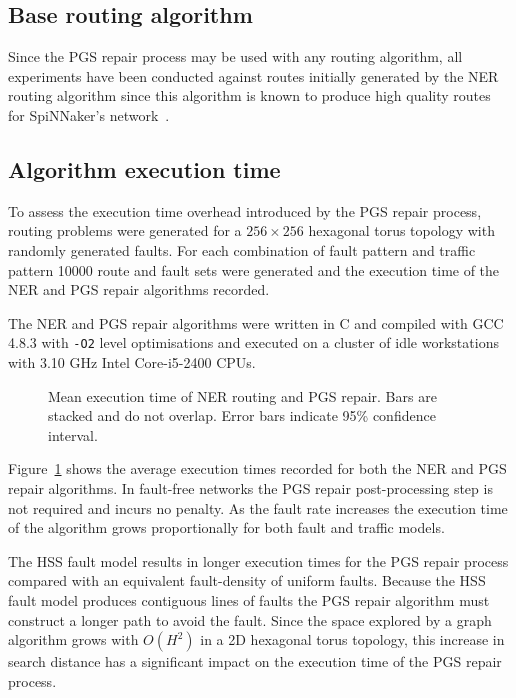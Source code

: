 		\subsection{Base routing algorithm}
			
			Since the PGS repair process may be used with any routing algorithm, all
			experiments have been conducted against routes initially generated by the
			NER routing algorithm since this algorithm is known to produce high
			quality routes for SpiNNaker's network~\cite{navaridas14}.
			
		\subsection{Algorithm execution time}
			
			To assess the execution time overhead introduced by the PGS repair
			process, routing problems were generated for a $256\times256$ hexagonal
			torus topology with randomly generated faults. For each combination of
			fault pattern and traffic pattern \num{10000} route and fault sets were
			generated and the execution time of the NER and PGS repair algorithms
			recorded.
			
			The NER and PGS repair algorithms were written in C and compiled with GCC
			4.8.3 with \verb|-O2| level optimisations and executed on a cluster of
			idle workstations with 3.10 GHz Intel Core-i5-2400 CPUs.
			
			\begin{figure}
				\center
				
				\caption[Mean execution time of NER routing and PGS repair.]%
				{Mean execution time of NER routing and PGS repair. Bars are stacked
				and do not overlap. Error bars indicate 95\% confidence interval.}
				\label{fig:routing-runtimes}
			\end{figure}
			
			Figure~\ref{fig:routing-runtimes} shows the average execution times
			recorded for both the NER and PGS repair algorithms. In fault-free
			networks the PGS repair post-processing step is not required and incurs
			no penalty. As the fault rate increases the execution time of the
			algorithm grows proportionally for both fault and traffic models.
			
			The HSS fault model results in longer execution times for the PGS repair
			process compared with an equivalent fault-density of uniform faults.
			Because the HSS fault model produces contiguous lines of faults the PGS
			repair algorithm must construct a longer path to avoid the fault.  Since
			the space explored by a graph algorithm grows with $O(H^2)$ in a 2D
			hexagonal torus topology, this increase in search distance has a
			significant impact on the execution time of the PGS repair process.
			
